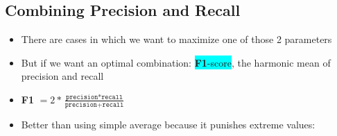 \documentclass[12pt,a4paper]{article}
\begin{document}
\subsection{Combining Precision and Recall}
\begin{itemize}
\item There are cases in which we want to maximize one of those 2 parameters
\item But if we want an optimal combination: \colorbox{cyan}{\textbf{F1}-score}, the harmonic mean of precision and recall
\item \textbf{F1} $=2*\frac{\texttt{precision} * \texttt{recall}}{\texttt{precision}+\texttt{recall}}$
\item Better than using simple average because it punishes extreme values:
\end{itemize}
\end{document}
